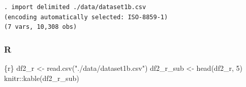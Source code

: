 \documentclass[
  letterpaper,
  DIV=11,
  numbers=noendperiod,
  oneside]{scrreprt}
\newenvironment{Shaded}{\begin{snugshade}}{\end{snugshade}}
\newcommand{\DecValTok}[1]{\textcolor[rgb]{0.68,0.00,0.00}{#1}}
\newcommand{\FunctionTok}[1]{\textcolor[rgb]{0.28,0.35,0.67}{#1}}
\newcommand{\InformationTok}[1]{\textcolor[rgb]{0.37,0.37,0.37}{#1}}
\newcommand{\NormalTok}[1]{\textcolor[rgb]{0.00,0.23,0.31}{#1}}
\newcommand{\OtherTok}[1]{\textcolor[rgb]{0.00,0.23,0.31}{#1}}
\newcommand{\SpecialCharTok}[1]{\textcolor[rgb]{0.37,0.37,0.37}{#1}}
\newcommand{\StringTok}[1]{\textcolor[rgb]{0.13,0.47,0.30}{#1}}
\begin{document}
\begin{verbatim}
. import delimited ./data/dataset1b.csv
(encoding automatically selected: ISO-8859-1)
(7 vars, 10,308 obs)
\end{verbatim}

\subsubsection{R}

\begin{Shaded}
\begin{Highlighting}[]
\InformationTok{\textasciigrave{}\textasciigrave{}\textasciigrave{}\{r\}}
\NormalTok{df2\_r }\OtherTok{\textless{}{-}} \FunctionTok{read.csv}\NormalTok{(}\StringTok{"./data/dataset1b.csv"}\NormalTok{)}
\NormalTok{df2\_r\_sub }\OtherTok{\textless{}{-}} \FunctionTok{head}\NormalTok{(df2\_r, }\DecValTok{5}\NormalTok{)}
\NormalTok{knitr}\SpecialCharTok{::}\FunctionTok{kable}\NormalTok{(df2\_r\_sub)}
\InformationTok{\textasciigrave{}\textasciigrave{}\textasciigrave{}}
\end{Highlighting}
\end{Shaded}
\end{document}
